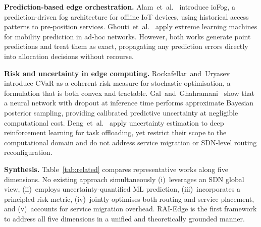 \documentclass[conference]{IEEEtran}
\begin{document}
\textbf{Prediction-based edge orchestration.}
Alam~et~al.~\cite{9498796} introduce ioFog, a prediction-driven fog
architecture for offline IoT devices, using historical access patterns
to pre-position services. Ghouti~et~al.~\cite{ghouti2013mobility}
apply extreme learning machines for mobility prediction in ad-hoc
networks. However, both works generate point predictions and treat them
as exact, propagating any prediction errors directly into allocation
decisions without recourse.

\textbf{Risk and uncertainty in edge computing.}
Rockafellar~and~Uryasev~\cite{rockafellar2000optimization} introduce
CVaR as a coherent risk measure for stochastic optimisation, a
formulation that is both convex and tractable. Gal~and~Ghahramani~\cite{gal2016dropout}
show that a neural network with dropout at inference time performs
approximate Bayesian posterior sampling, providing calibrated
predictive uncertainty at negligible computational cost.
Deng~et~al.~\cite{deng2020uncertainty} apply uncertainty estimation
to deep reinforcement learning for task offloading, yet restrict
their scope to the computational domain and do not address service
migration or SDN-level routing reconfiguration.

\textbf{Synthesis.}
Table~\ref{tab:related} compares representative works along five
dimensions. No existing approach simultaneously (i)~leverages an SDN
global view, (ii)~employs uncertainty-quantified ML prediction,
(iii)~incorporates a principled risk metric, (iv)~jointly optimises
both routing and service placement, and (v)~accounts for service
migration overhead. RAI-Edge is the first framework to address all five
dimensions in a unified and theoretically grounded manner.
\end{document}
